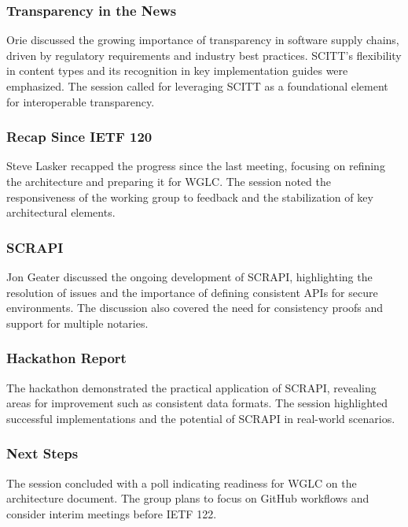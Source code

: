 \documentclass{article}
\begin{document}
\subsubsection{Transparency in the News}

Orie discussed the growing importance of transparency in software supply chains, driven by regulatory requirements and industry best practices. SCITT's flexibility in content types and its recognition in key implementation guides were emphasized. The session called for leveraging SCITT as a foundational element for interoperable transparency.

\subsubsection{Recap Since IETF 120}

Steve Lasker recapped the progress since the last meeting, focusing on refining the architecture and preparing it for WGLC. The session noted the responsiveness of the working group to feedback and the stabilization of key architectural elements.

\subsubsection{SCRAPI}

Jon Geater discussed the ongoing development of SCRAPI, highlighting the resolution of issues and the importance of defining consistent APIs for secure environments. The discussion also covered the need for consistency proofs and support for multiple notaries.

\subsubsection{Hackathon Report}

The hackathon demonstrated the practical application of SCRAPI, revealing areas for improvement such as consistent data formats. The session highlighted successful implementations and the potential of SCRAPI in real-world scenarios.

\subsubsection{Next Steps}

The session concluded with a poll indicating readiness for WGLC on the architecture document. The group plans to focus on GitHub workflows and consider interim meetings before IETF 122.
\end{document}
